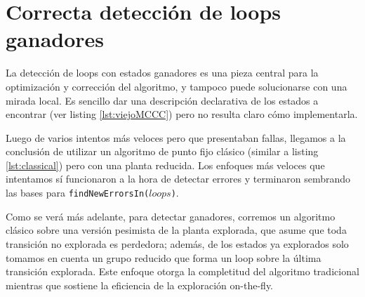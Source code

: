 % 
% 
% 


\section{Correcta detección de loops ganadores}

La detección de loops con estados ganadores es una pieza central para la optimización y corrección del algoritmo, y tampoco puede solucionarse con una mirada local. Es sencillo dar una descripción declarativa de los estados a encontrar (ver listing \ref{lst:viejoMCCC}) pero no resulta claro cómo implementarla. 

Luego de varios intentos más veloces pero que presentaban fallas, llegamos a la conclusión de utilizar un algoritmo de punto fijo clásico (similar a listing \ref{lst:classical}) pero con una planta reducida. Los enfoques más veloces que intentamos sí funcionaron a la hora de detectar errores y terminaron sembrando las bases para \texttt{findNewErrorsIn($loops$)}.

Como se verá más adelante, para detectar ganadores, corremos un algoritmo clásico sobre una versión pesimista de la planta explorada, que asume que toda transición no explorada es perdedora; además, de los estados ya explorados solo tomamos en cuenta un grupo reducido que forma un loop sobre la última transición explorada. Este enfoque otorga la completitud del algoritmo tradicional mientras que sostiene la eficiencia de la exploración on-the-fly.

